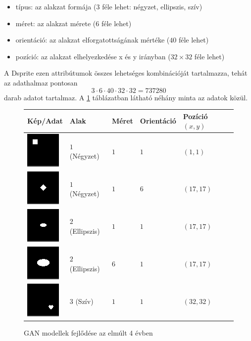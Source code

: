 \documentclass[12pt]{article}
\begin{document}
\begin{itemize}
  \item típus: az alakzat formája ($3$ féle lehet: négyzet, ellipszis, szív)
  \item méret: az alakzat mérete ($6$ féle lehet)
  \item orientáció: az alakzat elforgatottságának mértéke ($40$ féle lehet)
  \item pozíció: az alakzat elhelyezkedése x és y irányban ($32\times32$ féle lehet)
\end{itemize}

A Dsprite ezen attribútumok összes lehetséges kombinációját tartalmazza, tehát az adathalmaz pontosan
$$ 3\cdot6\cdot40\cdot32\cdot32= 737280$$
darab adatot tartalmaz. A \ref{samples} táblázatban látható néhány minta az adatok közül.

\begin{figure}[h!]
\begin{center}
\label{samples}
\begin{tabular}{| m{2.5cm} | m{2.5cm} | m{2cm}  | m{2cm} |  m{2.5cm} |}
\hline
Kép/Adat & Alak & Méret & Orientáció & Pozíció $(x,y)$ \\
\hline\hline
\includegraphics{sample00000.png} & $1$ (Négyzet) & $1$ & $1$ & $(1,1)$ \\
\hline
\includegraphics{sample0051616.png} & $1$ (Négyzet) & $1$ & $6$ & $(17,17)$ \\
\hline
\includegraphics{sample1001616.png} & $2$ (Ellipszis) & $1$ & $1$ & $(17,17)$ \\
\hline
\includegraphics{sample1501616.png} & $2$ (Ellipszis) & $6$ & $1$ & $(17,17)$ \\
\hline
\includegraphics{sample2003131.png} & $3$ (Szív) & $1$ & $1$ & $(32,32)$ \\
\hline
\end{tabular}
\end{center}
\caption{GAN modellek fejlődése az elmúlt 4 évben}
\end{figure}
\end{document}
